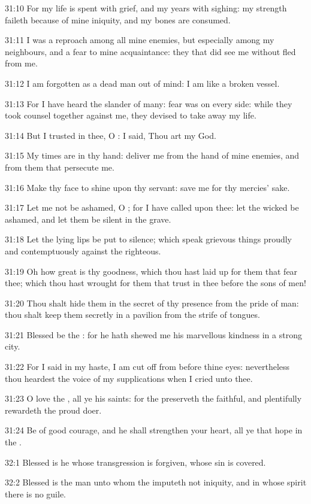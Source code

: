 31:10 For my life is spent with grief, and my years with sighing: my
strength faileth because of mine iniquity, and my bones are consumed.

31:11 I was a reproach among all mine enemies, but especially among my
neighbours, and a fear to mine acquaintance: they that did see me
without fled from me.

31:12 I am forgotten as a dead man out of mind: I am like a broken
vessel.

31:13 For I have heard the slander of many: fear was on every side:
while they took counsel together against me, they devised to take away
my life.

31:14 But I trusted in thee, O \LORD: I said, Thou art my God.

31:15 My times are in thy hand: deliver me from the hand of mine
enemies, and from them that persecute me.

31:16 Make thy face to shine upon thy servant: save me for thy
mercies' sake.

31:17 Let me not be ashamed, O \LORD; for I have called upon thee: let
the wicked be ashamed, and let them be silent in the grave.

31:18 Let the lying lips be put to silence; which speak grievous
things proudly and contemptuously against the righteous.

31:19 Oh how great is thy goodness, which thou hast laid up for them
that fear thee; which thou hast wrought for them that trust in thee
before the sons of men!

31:20 Thou shalt hide them in the secret of thy presence from the
pride of man: thou shalt keep them secretly in a pavilion from the
strife of tongues.

31:21 Blessed be the \LORD: for he hath shewed me his marvellous
kindness in a strong city.

31:22 For I said in my haste, I am cut off from before thine eyes:
nevertheless thou heardest the voice of my supplications when I cried
unto thee.

31:23 O love the \LORD, all ye his saints: for the \LORD preserveth the
faithful, and plentifully rewardeth the proud doer.

31:24 Be of good courage, and he shall strengthen your heart, all ye
that hope in the \LORD.



32:1 Blessed is he whose transgression is forgiven, whose sin is
covered.

32:2 Blessed is the man unto whom the \LORD imputeth not iniquity, and
in whose spirit there is no guile.

